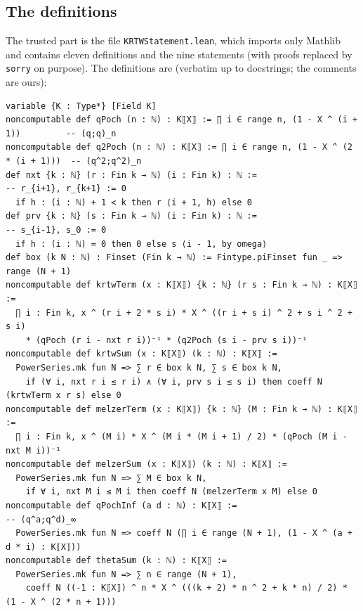 \documentclass[11pt]{amsart}
\theoremstyle{definition}
\numberwithin{equation}{section}
\newcommand{\fpath}[1]{\nolinkurl{#1}}
\begin{document}
\subsection{The definitions}
The trusted part is the file \fpath{KRTWStatement.lean}, which imports only Mathlib and contains eleven
definitions and the nine statements (with proofs replaced by \texttt{sorry} on purpose). The
definitions are (verbatim up to docstrings; the comments are ours):
\begin{lstlisting}
variable {K : Type*} [Field K]
noncomputable def qPoch (n : ℕ) : K⟦X⟧ := ∏ i ∈ range n, (1 - X ^ (i + 1))         -- (q;q)_n
noncomputable def q2Poch (n : ℕ) : K⟦X⟧ := ∏ i ∈ range n, (1 - X ^ (2 * (i + 1)))  -- (q^2;q^2)_n
def nxt {k : ℕ} (r : Fin k → ℕ) (i : Fin k) : ℕ :=                                  -- r_{i+1}, r_{k+1} := 0
  if h : (i : ℕ) + 1 < k then r ⟨i + 1, h⟩ else 0
def prv {k : ℕ} (s : Fin k → ℕ) (i : Fin k) : ℕ :=                                  -- s_{i-1}, s_0 := 0
  if h : (i : ℕ) = 0 then 0 else s ⟨i - 1, by omega⟩
def box (k N : ℕ) : Finset (Fin k → ℕ) := Fintype.piFinset fun _ => range (N + 1)
noncomputable def krtwTerm (x : K⟦X⟧) {k : ℕ} (r s : Fin k → ℕ) : K⟦X⟧ :=
  ∏ i : Fin k, x ^ (r i + 2 * s i) * X ^ ((r i + s i) ^ 2 + s i ^ 2 + s i)
    * (qPoch (r i - nxt r i))⁻¹ * (q2Poch (s i - prv s i))⁻¹
noncomputable def krtwSum (x : K⟦X⟧) (k : ℕ) : K⟦X⟧ :=
  PowerSeries.mk fun N => ∑ r ∈ box k N, ∑ s ∈ box k N,
    if (∀ i, nxt r i ≤ r i) ∧ (∀ i, prv s i ≤ s i) then coeff N (krtwTerm x r s) else 0
noncomputable def melzerTerm (x : K⟦X⟧) {k : ℕ} (M : Fin k → ℕ) : K⟦X⟧ :=
  ∏ i : Fin k, x ^ (M i) * X ^ (M i * (M i + 1) / 2) * (qPoch (M i - nxt M i))⁻¹
noncomputable def melzerSum (x : K⟦X⟧) (k : ℕ) : K⟦X⟧ :=
  PowerSeries.mk fun N => ∑ M ∈ box k N,
    if ∀ i, nxt M i ≤ M i then coeff N (melzerTerm x M) else 0
noncomputable def qPochInf (a d : ℕ) : K⟦X⟧ :=                                   -- (q^a;q^d)_∞
  PowerSeries.mk fun N => coeff N (∏ i ∈ range (N + 1), (1 - X ^ (a + d * i) : K⟦X⟧))
noncomputable def thetaSum (k : ℕ) : K⟦X⟧ :=
  PowerSeries.mk fun N => ∑ n ∈ range (N + 1),
    coeff N ((-1 : K⟦X⟧) ^ n * X ^ (((k + 2) * n ^ 2 + k * n) / 2) * (1 - X ^ (2 * n + 1)))
\end{lstlisting}
\end{document}
